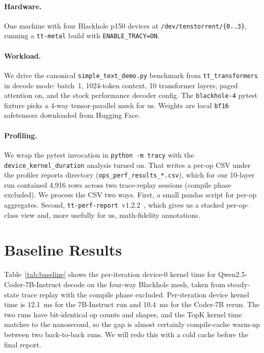\documentclass[sigplan,nonacm,review]{acmart}
\begin{document}
\paragraph{Hardware.} One machine with four Blackhole p150 devices at
\texttt{/dev/tenstorrent/\{0..3\}}, running a \texttt{tt-metal} build
with \texttt{ENABLE\_TRACY=ON}.

\paragraph{Workload.} We drive the canonical
\texttt{simple\_text\_demo.py} benchmark from
\texttt{tt\_transformers} in decode mode: batch~1, 1024-token context,
10 transformer layers, paged attention on, and the stock
performance decoder config. The \texttt{blackhole-4} pytest fixture
picks a 4-way tensor-parallel mesh for us. Weights are local
\texttt{bf16} safetensors downloaded from Hugging Face.

\paragraph{Profiling.} We wrap the pytest invocation in
\texttt{python -m tracy} with the \texttt{device\_kernel\_duration}
analysis turned on. That writes a per-op CSV under the profiler
reports directory (\texttt{ops\_perf\_results\_*.csv}), which for our
10-layer run contained 4{,}916 rows across two trace-replay sessions
(compile phase excluded). We process the CSV two ways. First, a small
pandas script for per-op aggregates. Second,
\texttt{tt-perf-report}~v1.2.2~\cite{ttperfreport}, which gives us a
stacked per-op-class view and, more usefully for us, math-fidelity
annotations.

\section{Baseline Results}
Table~\ref{tab:baseline} shows the per-iteration device-0 kernel time
for Qwen2.5-Coder-7B-Instruct decode on the four-way Blackhole mesh,
taken from steady-state trace replay with the compile phase excluded.
Per-iteration device kernel time is 12.1~ms for the 7B-Instruct run and
10.4~ms for the Coder-7B rerun. The two runs have bit-identical op
counts and shapes, and the TopK kernel time matches to the nanosecond,
so the gap is almost certainly compile-cache warm-up between two
back-to-back runs. We will redo this with a cold cache before the final
report.
\end{document}
